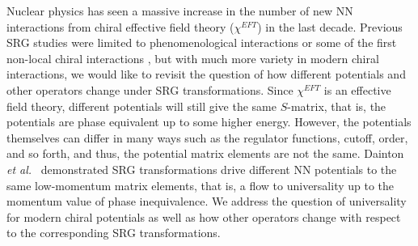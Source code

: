 \documentclass[preprintnumbers,floatfix,aps,prc,preprint,nofootinbib]{revtex4-1}
\begin{document}

Nuclear physics has seen a massive increase in the number of new NN interactions from chiral effective field theory ($\chi^{EFT}$) in the last decade. Previous SRG studies were limited to phenomenological interactions or some of the first non-local chiral interactions \cite{Entem:2003ft}, but with much more variety in modern chiral interactions, we would like to revisit the question of how different potentials and other operators change under SRG transformations. Since $\chi^{EFT}$ is an effective field theory, different potentials will still give the same $S$-matrix, that is, the potentials are phase equivalent up to some higher energy. However, the potentials themselves can differ in many ways such as the regulator functions, cutoff, order, and so forth, and thus, the potential matrix elements are not the same. Dainton \textit{et al.}~\cite{Dainton:2013axa} demonstrated SRG transformations drive different NN potentials to the same low-momentum matrix elements, that is, a flow to universality up to the momentum value of phase inequivalence. We address the question of universality for modern chiral potentials as well as how other operators change with respect to the corresponding SRG transformations.
\\
\end{document}
